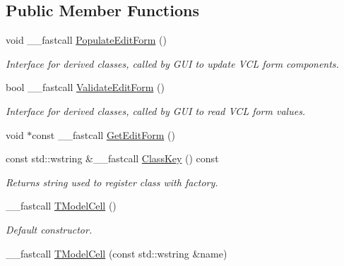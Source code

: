 \subsection*{Public Member Functions}
\begin{DoxyCompactItemize}
\item 
\hypertarget{class_t_model_cell_ac81ddf570c5e202e118df93358b27346}{void \+\_\+\+\_\+fastcall \hyperlink{class_t_model_cell_ac81ddf570c5e202e118df93358b27346}{Populate\+Edit\+Form} ()}\label{class_t_model_cell_ac81ddf570c5e202e118df93358b27346}

\begin{DoxyCompactList}\small\item\em Interface for derived classes, called by G\+U\+I to update V\+C\+L form components. \end{DoxyCompactList}\item 
\hypertarget{class_t_model_cell_af0270c4542ef0650730894f4eeb18ddd}{bool \+\_\+\+\_\+fastcall \hyperlink{class_t_model_cell_af0270c4542ef0650730894f4eeb18ddd}{Validate\+Edit\+Form} ()}\label{class_t_model_cell_af0270c4542ef0650730894f4eeb18ddd}

\begin{DoxyCompactList}\small\item\em Interface for derived classes, called by G\+U\+I to read V\+C\+L form values. \end{DoxyCompactList}\item 
void $\ast$const \+\_\+\+\_\+fastcall \hyperlink{class_t_model_cell_af69daf6390baa3fc7ba7c11aa0d726ad}{Get\+Edit\+Form} ()
\item 
const std\+::wstring \&\+\_\+\+\_\+fastcall \hyperlink{class_t_model_cell_aaaffe113670920605dffda564b475ad0}{Class\+Key} () const 
\begin{DoxyCompactList}\small\item\em Returns string used to register class with factory. \end{DoxyCompactList}\item 
\hypertarget{class_t_model_cell_ad4ff3db085daa54b5aa2005fa5c87452}{\+\_\+\+\_\+fastcall \hyperlink{class_t_model_cell_ad4ff3db085daa54b5aa2005fa5c87452}{T\+Model\+Cell} ()}\label{class_t_model_cell_ad4ff3db085daa54b5aa2005fa5c87452}

\begin{DoxyCompactList}\small\item\em Default constructor. \end{DoxyCompactList}\item 
\hypertarget{class_t_model_cell_a7815944ffd27ce0c0d20f97bf1d4a668}{\+\_\+\+\_\+fastcall \hyperlink{class_t_model_cell_a7815944ffd27ce0c0d20f97bf1d4a668}{T\+Model\+Cell} (const std\+::wstring \&name)}\label{class_t_model_cell_a7815944ffd27ce0c0d20f97bf1d4a668}


\end{DoxyCompactItemize}
